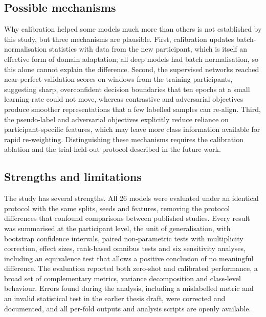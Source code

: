 \subsection{Possible mechanisms}
Why calibration helped some models much more than others is not established by this study, but three mechanisms are plausible. First, calibration updates batch-normalisation statistics with data from the new participant, which is itself an effective form of domain adaptation\cite{adabn}; all deep models had batch normalisation, so this alone cannot explain the difference. Second, the supervised networks reached near-perfect validation scores on windows from the training participants, suggesting sharp, overconfident decision boundaries that ten epochs at a small learning rate could not move, whereas contrastive and adversarial objectives produce smoother representations that a few labelled samples can re-align. Third, the pseudo-label and adversarial objectives explicitly reduce reliance on participant-specific features, which may leave more class information available for rapid re-weighting. Distinguishing these mechanisms requires the calibration ablation and the trial-held-out protocol described in the future work.


\subsection{Strengths and limitations}
The study has several strengths. All 26 models were evaluated under an identical protocol with the same splits, seeds and features, removing the protocol differences that confound comparisons between published studies. Every result was summarised at the participant level, the unit of generalisation, with bootstrap confidence intervals, paired non-parametric tests with multiplicity correction, effect sizes, rank-based omnibus tests and six sensitivity analyses, including an equivalence test that allows a positive conclusion of no meaningful difference. The evaluation reported both zero-shot and calibrated performance, a broad set of complementary metrics, variance decomposition and class-level behaviour. Errors found during the analysis, including a mislabelled metric and an invalid statistical test in the earlier thesis draft, were corrected and documented, and all per-fold outputs and analysis scripts are openly available.

